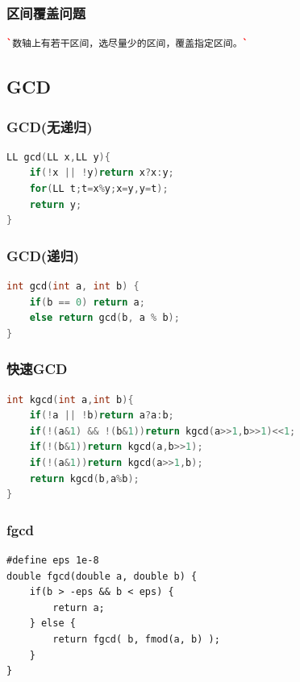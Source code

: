\documentclass[a4paper]{article}
\begin{document}
\begin{CJK*}{UTF8}{gbsn}
\begin{multicols}{3}
\begin{flushleft}
\subsubsection{区间覆盖问题}
\begin{lstlisting}[language={c++}]
`数轴上有若干区间，选尽量少的区间，覆盖指定区间。`
\end{lstlisting}



\subsection{GCD}


\subsubsection{GCD(无递归)}
\begin{lstlisting}[language={c++}]
LL gcd(LL x,LL y){
	if(!x || !y)return x?x:y;
	for(LL t;t=x%y;x=y,y=t);
	return y;
}
\end{lstlisting}



\subsubsection{GCD(递归)}
\begin{lstlisting}[language={c++}]
int gcd(int a, int b) {
	if(b == 0) return a;
	else return gcd(b, a % b);
}
\end{lstlisting}

\subsubsection{快速GCD}
\begin{lstlisting}[language={c++}]
int kgcd(int a,int b){
	if(!a || !b)return a?a:b;
	if(!(a&1) && !(b&1))return kgcd(a>>1,b>>1)<<1;
	if(!(b&1))return kgcd(a,b>>1);
	if(!(a&1))return kgcd(a>>1,b);
	return kgcd(b,a%b);
}
\end{lstlisting}

\subsubsection{fgcd}
\begin{lstlisting}
#define eps 1e-8
double fgcd(double a, double b) {
	if(b > -eps && b < eps) {
		return a;
	} else {
		return fgcd( b, fmod(a, b) );
	}
}
\end{lstlisting}



\end{flushleft}
\end{multicols}
\end{CJK*}
\end{document}
